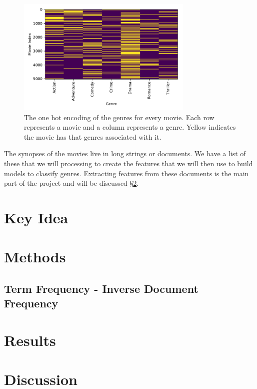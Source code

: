 \documentclass[11pt]{article}
\begin{document}
\begin{figure}[ht]
	\centering
		\includegraphics[width=0.75\textwidth]{one_hot_genres.pdf}
	\caption{The one hot encoding of the genres for every movie. Each row represents a movie and a column represents a genre. Yellow indicates the movie has that genres associated with it.}
	\label{fig:one_hot}
\end{figure}

The synopses of the movies live in long strings or documents. We have a list of these that we will processing to create the features that we will then use to build models to classify genres. Extracting features from these documents is the main part of the project and will be discussed \S \ref{sec:methods}.

\section{Key Idea}
\label{sec:key_idea}

\section{Methods}
\label{sec:methods}

\subsection{Term Frequency - Inverse Document Frequency}
\label{sec:tfidf}


\section{Results}
\label{sec:results}

\section{Discussion}
\label{sec:discussion}

{}

\end{document}
